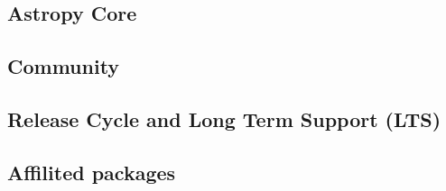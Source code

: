 \documentclass[10pt]{article}
\begin{document}
\begin{myposter}
\begin{myshadowfixed}{112mm}{145mm}
\section*{Astropy Core}

\vfill
\end{myshadowfixed}\hspace*{4mm}%
%
%
\begin{myshadowfixed}{112mm}{145mm}

\section*{Community}

\vfill
\end{myshadowfixed}
%
%
\vspace*{3mm}%
%
\begin{myshadowfixed}{112mm}{145mm}
\section*{Release Cycle and Long Term Support (LTS)}

\vfill
\end{myshadowfixed}\hspace*{4mm}%
%
%
\begin{myshadowfixed}{112mm}{145mm}

\section*{Affilited packages}

\vfill
\end{myshadowfixed}\hspace*{4mm}%
%
%
\begin{myshadowfixed}{112mm}{145mm}

\section*{}

\vfill
\end{myshadowfixed}
%
%
\vspace*{2mm}%
%
%
\begin{myshadowfixed}{375mm}{20mm}


\end{myshadowfixed}
\end{myposter}
\end{document}

